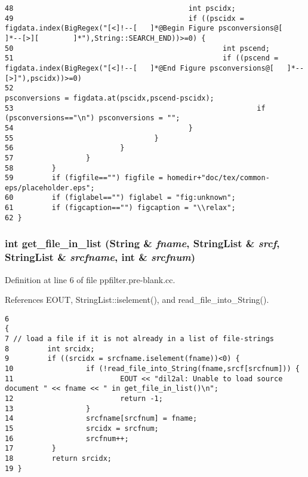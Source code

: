 \begin{verbatim}
48                                         int pscidx;
49                                         if ((pscidx = figdata.index(BigRegex("[<]!--[   ]*@Begin Figure psconversions@[         ]*--[>][        ]*"),String::SEARCH_END))>=0) {
50                                                 int pscend;
51                                                 if ((pscend = figdata.index(BigRegex("[<]!--[   ]*@End Figure psconversions@[   ]*--[>]"),pscidx))>=0)
52                                                         psconversions = figdata.at(pscidx,pscend-pscidx);
53                                                         if (psconversions=="\n") psconversions = "";
54                                         }
55                                 }
56                         }
57                 }
58         }
59         if (figfile=="") figfile = homedir+"doc/tex/common-eps/placeholder.eps";
60         if (figlabel=="") figlabel = "fig:unknown";
61         if (figcaption=="") figcaption = "\\relax";
62 }
\end{verbatim}\normalsize 
{}
\subsubsection{\setlength{\rightskip}{0pt plus 5cm}int get\_\-file\_\-in\_\-list ({\bf String} \& {\em fname}, {\bf String\-List} \& {\em srcf}, {\bf String\-List} \& {\em srcfname}, int \& {\em srcfnum})}\label{ppfilter_8pre-blank_8cc_a0}




Definition at line 6 of file ppfilter.pre-blank.cc.

References EOUT, String\-List::iselement(), and read\_\-file\_\-into\_\-String().



\footnotesize\begin{verbatim}6                                                                                              {
7 // load a file if it is not already in a list of file-strings
8         int srcidx;
9         if ((srcidx = srcfname.iselement(fname))<0) {
10                 if (!read_file_into_String(fname,srcf[srcfnum])) {
11                         EOUT << "dil2al: Unable to load source document " << fname << " in get_file_in_list()\n";
12                         return -1;
13                 }
14                 srcfname[srcfnum] = fname;
15                 srcidx = srcfnum;
16                 srcfnum++;
17         }
18         return srcidx;
19 }
\end{verbatim}\normalsize 
{}
